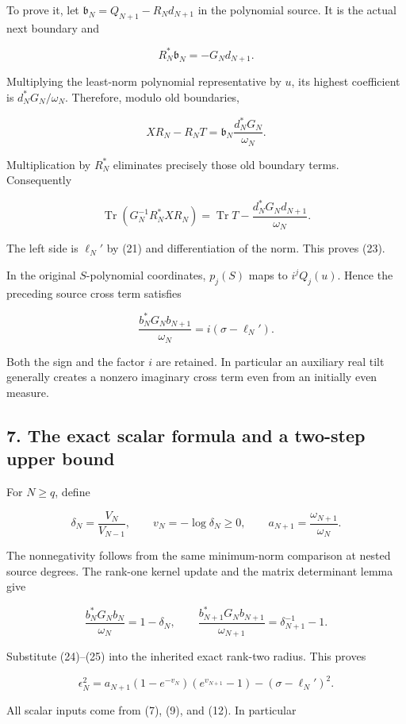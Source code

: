 To prove it, let \(\mathfrak b_N=Q_{N+1}-R_Nd_{N+1}\) in the polynomial
source. It is the actual next boundary and

\[
R_N^*\mathfrak b_N=-G_Nd_{N+1}.
\]

Multiplying the least-norm polynomial representative by \(u\), its
highest coefficient is \(d_N^*G_N/\omega_N\). Therefore, modulo old
boundaries,

\[
XR_N-R_NT=\mathfrak b_N\frac{d_N^*G_N}{\omega_N}.
\]

Multiplication by \(R_N^*\) eliminates precisely those old boundary
terms. Consequently

\[
\operatorname{Tr}(G_N^{-1}R_N^*XR_N)
=\operatorname{Tr}T-\frac{d_N^*G_Nd_{N+1}}{\omega_N}.
\]

The left side is \(\ell_N'\) by (21) and differentiation of the norm.
This proves (23).

In the original \(S\)-polynomial coordinates, \(p_j(S)\) maps to
\(i^jQ_j(u)\). Hence the preceding source cross term satisfies

\[
\boxed{\frac{b_N^*G_Nb_{N+1}}{\omega_N}=i(\sigma-\ell_N').}
\tag{24}
\]

Both the sign and the factor \(i\) are retained. In particular an
auxiliary real tilt generally creates a nonzero imaginary cross term
even from an initially even measure.

\subsection{7. The exact scalar formula and a two-step upper
bound}\label{toda_volume:the-exact-scalar-formula-and-a-two-step-upper-bound}

For \(N\ge q\), define

\[
\delta_N=\frac{V_N}{V_{N-1}},\qquad v_N=-\log\delta_N\ge0,
\qquad a_{N+1}=\frac{\omega_{N+1}}{\omega_N}.
\]

The nonnegativity follows from the same minimum-norm comparison at
nested source degrees. The rank-one kernel update and the matrix
determinant lemma give

\[
\frac{b_N^*G_Nb_N}{\omega_N}=1-\delta_N,
\qquad
\frac{b_{N+1}^*G_Nb_{N+1}}{\omega_{N+1}}=\delta_{N+1}^{-1}-1.
\tag{25}
\]

Substitute (24)--(25) into the inherited exact rank-two radius. This
proves

\[
\boxed{
\epsilon_N^2=a_{N+1}(1-e^{-v_N})(e^{v_{N+1}}-1)-(\sigma-\ell_N')^2.
}
\tag{26}
\]

All scalar inputs come from (7), (9), and (12). In particular

